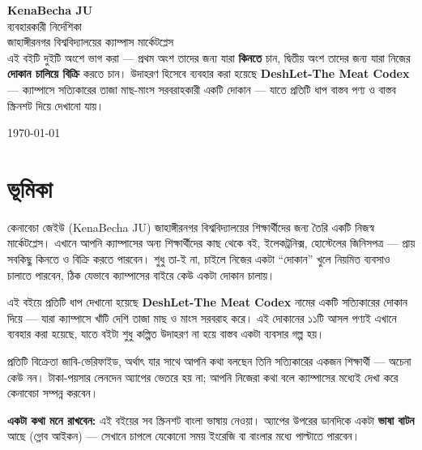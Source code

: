 \documentclass[11pt]{article}
\begin{document}
\begin{titlepage}
  \centering
  \vspace*{2.2cm}
  {\Huge\bfseries\color{brandgreen} KenaBecha JU}\\[0.4cm]
  {\LARGE\color{darktext} ব্যবহারকারী নির্দেশিকা}\\[0.3cm]
  {\large\color{graytext} জাহাঙ্গীরনগর বিশ্ববিদ্যালয়ের ক্যাম্পাস মার্কেটপ্লেস}\\[1.6cm]

  {\normalsize\color{graytext}
  এই বইটি দুইটি অংশে ভাগ করা --- প্রথম অংশ তাদের জন্য যারা \textbf{কিনতে} চান,
  দ্বিতীয় অংশ তাদের জন্য যারা নিজের \textbf{দোকান চালিয়ে বিক্রি} করতে চান।
  উদাহরণ হিসেবে ব্যবহার করা হয়েছে \textbf{DeshLet-The Meat Codex} ---
  ক্যাম্পাসে সত্যিকারের তাজা মাছ-মাংস সরবরাহকারী একটি দোকান ---
  যাতে প্রতিটি ধাপ বাস্তব পণ্য ও বাস্তব স্ক্রিনশট দিয়ে দেখানো যায়।}

  \vfill
  {\small\color{graytext} \today}
\end{titlepage}

\tableofcontents
\newpage

\section*{ভূমিকা}

কেনাবেচা জেইউ (KenaBecha JU) জাহাঙ্গীরনগর বিশ্ববিদ্যালয়ের শিক্ষার্থীদের
জন্য তৈরি একটি নিজস্ব মার্কেটপ্লেস। এখানে আপনি ক্যাম্পাসের অন্য
শিক্ষার্থীদের কাছ থেকে বই, ইলেকট্রনিক্স, হোস্টেলের জিনিসপত্র --- প্রায়
সবকিছু কিনতে ও বিক্রি করতে পারবেন। শুধু তা-ই না, চাইলে নিজের একটা
``দোকান'' খুলে নিয়মিত ব্যবসাও চালাতে পারবেন, ঠিক যেভাবে ক্যাম্পাসের
বাইরে কেউ একটা দোকান চালায়।

এই বইয়ে প্রতিটি ধাপ দেখানো হয়েছে \textbf{DeshLet-The Meat Codex} নামের
একটি সত্যিকারের দোকান দিয়ে --- যারা ক্যাম্পাসে খাঁটি দেশি তাজা মাছ ও
মাংস সরবরাহ করে। এই দোকানের ১১টি আসল পণ্যই এখানে ব্যবহার করা হয়েছে,
যাতে বইটা শুধু কল্পিত উদাহরণ না হয়ে বাস্তব একটা ব্যবসার গল্প হয়।

প্রতিটি বিক্রেতা জাবি-ভেরিফাইড, অর্থাৎ যার সাথে আপনি কথা বলছেন তিনি
সত্যিকারের একজন শিক্ষার্থী --- অচেনা কেউ নন। টাকা-পয়সার লেনদেন
অ্যাপের ভেতরে হয় না; আপনি নিজেরা কথা বলে ক্যাম্পাসের মধ্যেই দেখা করে
কেনাবেচা সম্পন্ন করবেন।

\begin{tipbox}
\textbf{একটা কথা মনে রাখবেন:} এই বইয়ের সব স্ক্রিনশট বাংলা ভাষায় নেওয়া।
অ্যাপের উপরের ডানদিকে একটা \textbf{ভাষা বাটন} আছে (গ্লোব আইকন) ---
সেখানে চাপলে যেকোনো সময় ইংরেজি বা বাংলার মধ্যে পাল্টাতে পারবেন।
\end{tipbox}
\end{document}
